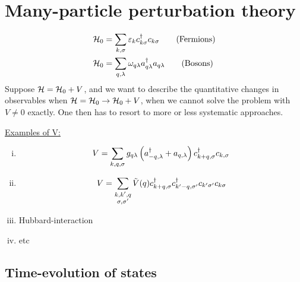 \chapter[Perturbation theory]{Many-particle perturbation theory}

\begin{align} 
\mathcal{H}_0 &= \sum_{k,\sigma}\varepsilon_kc^{\dagger}_{k\sigma}c_{k\sigma} \qquad \text{(Fermions)} \\
\mathcal{H}_0 &= \sum_{q, \lambda}\omega_{q\lambda}a^{\dagger}_{q\lambda} a_{q\lambda} \qquad \text{(Bosons)}
\end{align}
Suppose $\mathcal{H} = \mathcal{H}_0 + V$, and we want to describe the quantitative changes in observables when $\mathcal{H} = \mathcal{H}_0 \rightarrow \mathcal{H}_0 + V$, when we cannot solve the problem with $V\ne 0$ exactly. One then has to resort to more or less systematic approaches.

\underline{Examples of V:}
\begin{enumerate}[i)]
	\item \[V = \sum_{k,q,\sigma}g_{q\lambda}\left( a_{-q,\lambda}^\dagger + a_{q,\lambda} \right)c^{\dagger}_{k+q,\sigma}c_{k,\sigma}\]
	\item \[V=\sum_{\substack{k,k',q \\ \sigma,\sigma'}}\tilde{V}(q)c^{\dagger}_{k+q,\sigma}c^{\dagger}_{k'-q, \sigma'}c_{k'\sigma'}c_{k\sigma}\]
	\item Hubbard-interaction
	\item etc
\end{enumerate}

\section{Time-evolution of states}

